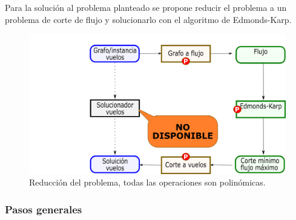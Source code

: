 \documentclass[../tp3_grupo404.tex]{subfiles}
\begin{document}
Para la solución al problema planteado se propone reducir el problema a un problema de corte de flujo
y solucionarlo con el algoritmo de Edmonds-Karp.

\begin{figure}[H]
    \centering
    \includegraphics[width=0.9\linewidth,angle=0,origin=c]{out/reduc.png}
    \caption{\label{reduc}Reducción del problema, todas las operaciones son polinómicas.}
\end{figure}

\subsubsection{Pasos generales}
\end{document}
